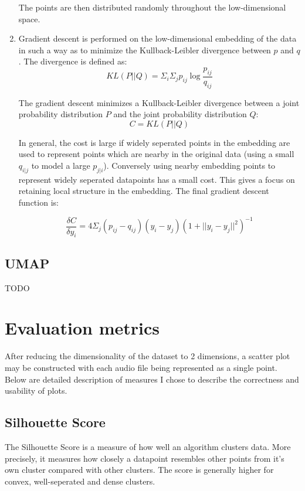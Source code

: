 \documentclass[a4paper, 12pt, twoside]{report}
\begin{document}
\begin{enumerate}
    The points are then distributed randomly throughout the low-dimensional space.

    \item Gradient descent is performed on the low-dimensional embedding of the data in such a way as to minimize the Kullback-Leibler divergence between $p$ and $q$. The divergence is defined as:
    \[ KL(P || Q) = \Sigma_{i}\Sigma_{j}p_{ij}\log \frac{p_{ij}}{q_{ij}} \]

    The gradient descent minimizes a Kullback-Leibler divergence between a joint probability distribution $P$ and the joint probability distribution $Q$:
    \[ C = KL(P||Q)\]

    In general, the cost is large if widely seperated points in the embedding are used to represent points which are nearby in the original data (using a small $q_{i|j}$ to model a large $p_{j|i}$). Conversely using nearby embedding points to represent widely seperated datapoints has a small cost. This gives a focus on retaining local structure in the embedding. The final gradient descent function is:

    \[ \frac{\delta C}{\delta y_{i}} = 4 \Sigma_{j}(p_{ij} - q_{ij})(y_{i} - y_{j})(1 + ||y_{i} - y_{j}||^{2})^{-1} \]

\end{enumerate}

\subsection{UMAP}
\label{sec:org6a758a8}
TODO

\section{Evaluation metrics}
\label{sec:org078e27c}

After reducing the dimensionality of the dataset to 2 dimensions, a scatter plot may be constructed with each audio file being represented as a single point. Below are detailed description of measures I chose to describe the correctness and usability of plots.
\subsection{Silhouette Score}
\label{sec:org8d91088}
The Silhouette Score is a measure of how well an algorithm clusters data. More precisely, it measures how closely a datapoint resembles other points from it's own cluster compared with other clusters. The score is generally higher for convex, well-seperated and dense clusters.
\end{document}
